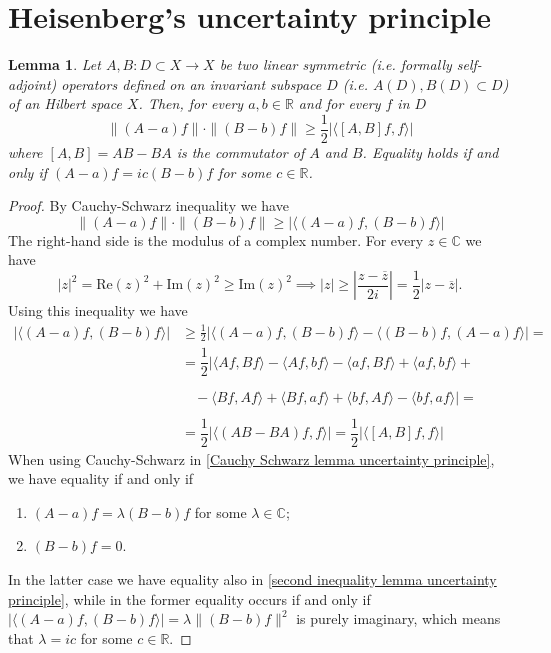 \documentclass[corpo=11pt, stile=classica, tipotesi=custom,
greek, evenboxes, english]{toptesi}
\numberwithin{equation}{chapter}
\newtheorem{lem}[teo]{Lemma}
\newcommand{\R}{\mathbb{R}} %
\newcommand{\C}{\mathbb{C}} %
\begin{document}
\section{Heisenberg's uncertainty principle}\label{section Heisenberg's UP}
{\color{red}\begin{lem}\label{uncertainty principle for operators lemma}
	Let $A,B: D \subset X \rightarrow X$ be two linear symmetric (i.e. formally self-adjoint) operators defined on an invariant subspace $D$ (i.e. $A(D),B(D) \subset D$) of an Hilbert space $X$. Then, for every $a,b \in \R$ and for every $f$ in $D$
	\begin{equation}\label{uncertainty principle for operators formula}
		\| (A-a)f \| \cdot \| (B-b) f\| \geq \dfrac12\lvert\langle [A,B]f,f \rangle \rvert
	\end{equation}
	where $[A,B] = AB-BA$ is the commutator of $A$ and $B$. Equality holds if and only if $(A-a)f = i c(B-b)f$ for some $c \in \R$.
\end{lem}}
\begin{proof}
	By Cauchy-Schwarz inequality we have
	\begin{equation}\label{Cauchy Schwarz lemma uncertainty principle}
		\| (A-a)f \| \cdot \| (B-b) f\| \geq |\langle (A-a)f, (B-b)f \rangle|
	\end{equation}
	The right-hand side is the modulus of a complex number. For every $z \in \C$ we have
	\begin{equation*}
		|z|^2 = \mathrm{Re}(z)^2 + \mathrm{Im}(z)^2 \geq \mathrm{Im}(z)^2 \implies |z| \geq \left| \dfrac{z-\overline{z}}{2i}\right| = \dfrac{1}{2} |z-\overline{z}|.
	\end{equation*}
	Using this inequality we have
	\begin{align}
		|\langle (A-a)f, (B-b)f \rangle| &\geq \frac{1}{2}\left| \langle (A-a)f, (B-b)f \rangle - \langle (B-b)f, (A-a)f \rangle \right| = \label{second inequality lemma uncertainty principle}\\
										 &=\dfrac{1}{2}| \langle Af,Bf \rangle - \langle Af,bf \rangle - \langle af,Bf \rangle + \langle af,bf \rangle +\nonumber\\
										 &\phantom{\dfrac{1}{2}|} - \langle Bf,Af \rangle + \langle Bf,af \rangle + \langle bf,Af \rangle - \langle bf,af \rangle | =\nonumber\\
										 &=\dfrac{1}{2}|\langle (AB - BA)f,f \rangle| = \dfrac{1}{2}|\langle [A,B]f,f \rangle| \nonumber
	\end{align}
	When using Cauchy-Schwarz in \eqref{Cauchy Schwarz lemma uncertainty principle}, we have equality if and only if
	\begin{enumerate}[label=(\roman*)]
		\item $(A-a)f = \lambda (B-b)f$ for some $\lambda \in \C$;
		\item $(B-b)f=0$.
	\end{enumerate}
	In the latter case we have equality also in \eqref{second inequality lemma uncertainty principle}, while in the former equality occurs if and only if $|\langle (A-a)f,(B-b)f\rangle| = \lambda \|(B-b)f\|^2$ is purely imaginary, which means that $\lambda = ic$ for some $c \in \R$.
\end{proof}
\end{document}
